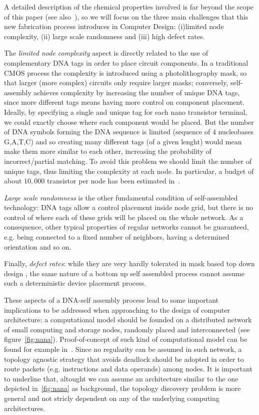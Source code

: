 A detailed description of the chemical properties involved is far
beyond the scope of this paper (see also~\cite{braun1998, seeman1999}), so we will focus on
the three main challenges that this new fabrication process introduces
in Computer Design: (i)limited node complexity, (ii) large scale
randomness and (iii) high defect rates.  

The \emph{limited node complexity} aspect is directly
related to the use of complementary DNA tags in order to place circuit
components. In a traditional CMOS process the complexity is introduced
using a photolithography mask, so that larger (more complex) circuits
only require larger masks; conversely, self-assembly achieves
complexity by increasing the number of unique DNA tags, since more
different tags means having more control on component placement. Ideally, by specifying a single
and unique tag for each nano transistor terminal, we could exactly
choose where each component would be placed. But the number of DNA
symbols forming the DNA sequence is limited (sequence of 4 nucleobases
G,A,T,C) and so creating many different tags (of a given lenght) would
mean make them more similar to each other, increasing the probability
of incorrect/partial matching. To avoid this problem we should limit
the number of unique tags, thus limiting the complexity at each node.
In particular, a budget of about $10,000$ transistor per node has been
estimated in~\cite{liu_jetcs}.

\emph{Large scale randomness} is the other fundamental condition of
self-assembled technology: DNA tags allow a control placement inside
node grid, but there is no control of where each of these  grids will
be placed on the whole network. As a consequence, other typical
properties of regular networks cannot be guaranteed, e.g. being
connected to a fixed number of neighbors, having a determined
orientation and so on.

Finally, \emph{defect rates}: while they are very hardly tolerated in mask
based top down design , the same nature of a bottom up self
assembled process cannot assume such a deterministic device placement
process.

These aspects of a DNA-self assembly process lead to some important
implications to be addressed when approaching to the design of
computer architecture: a computational model should be founded on a
distributed network of small computing and storage nodes, randomly
placed and interconnected (see figure~\ref{fig:nana}).
Proof-of-concept of such kind of computational model can be found for
example in~\cite{patwardhan2006_1}.  Since no regularity can be
assumed in such network, a topology agnostic strategy that avoids
deadlock should be adopted in order to route packets (e.g.
instructions and data operands) among nodes.  It is important to
underline that, altought we can assume an architecture similar to the
one depicted in~\ref{fig:nana} as background, the topology discovery
problem is more general and not stricly dependent on any of the
underlying computing architectures.

